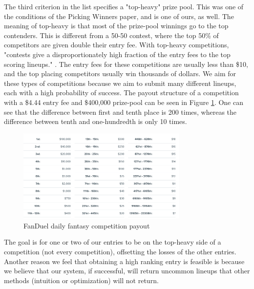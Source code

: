 The third criterion in the list specifies a "top-heavy" prize pool. This was one of the conditions of the Picking Winners paper, and is one of ours, as well. The meaning of top-heavy is that most of the prize-pool winnings go to the top contenders. This is different from a 50-50 contest, where the top 50\% of competitors are given double their entry fee. With top-heavy competitions, "contests give a disproportionately high fraction of the entry fees to the top scoring lineups." \cite{picking_winners}. The entry fees for these competitions are usually less than \$10, and the top placing competitors usually win thousands of dollars. We aim for these types of competitions because we aim to submit many different lineups, each with a high probability of success. The payout structure of a competition with a \$4.44 entry fee and \$400,000 prize-pool can be seen in Figure \ref{fig:comp_payout}. One can see that the difference between first and tenth place is 200 times, whereas the difference between tenth and one-hundredth is only 10 times.

\begin{figure}[ht]
    \centering
    \includegraphics[width=0.75\textwidth]{figures/fantasy_competition_payout}
    \caption{FanDuel daily fantasy competition payout}
    \label{fig:comp_payout}
\end{figure}

The goal is for one or two of our entries to be on the top-heavy side of a competition (not every competition), offsetting the losses of the other entries. Another reason we feel that obtaining a high ranking entry is feasible is because we believe that our system, if successful, will return uncommon lineups that other methods (intuition or optimization) will not return.

